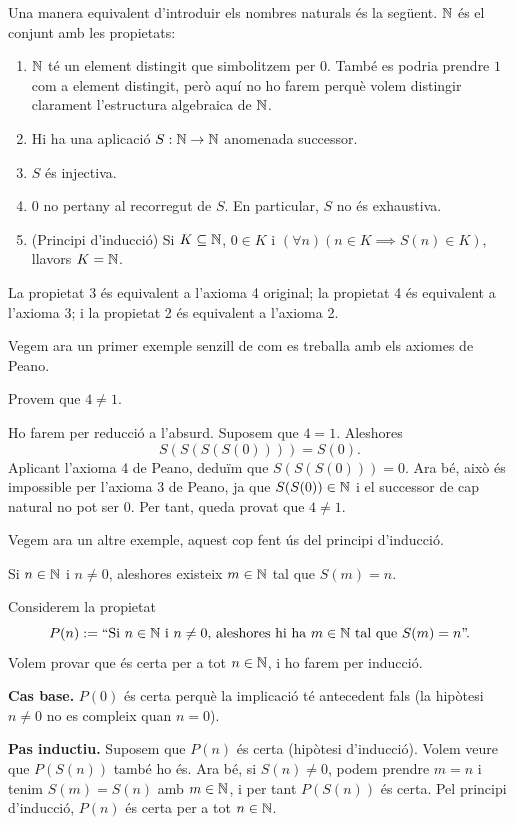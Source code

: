 \begin{observacio}
Una manera equivalent d'introduir els nombres naturals és la següent. $\mathbb{N}$ és el conjunt amb les propietats:
\begin{enumerate}
\item $\mathbb{N}$ té un element distingit que simbolitzem per $0$. També es podria prendre $1$ com a element distingit, però aquí no ho farem perquè volem distingir clarament l'estructura algebraica de $\mathbb{N}$.
\item Hi ha una aplicació $S:\mathbb{N}\rightarrow \mathbb{N}$ anomenada successor.
\item $S$ és injectiva.
\item $0$ no pertany al recorregut de $S$. En particular, $S$ no és exhaustiva.
\item (Principi d'inducció) Si $K\subseteq \mathbb{N}$, $0\in K$ i $\left( \forall n\right) \left( n\in K\implies S(n)\in K\right)$, llavors $K=\mathbb{N}$.
\end{enumerate}
La propietat 3 és equivalent a l'axioma 4 original; la propietat 4 és equivalent a l'axioma 3; i la propietat 2 és equivalent a l’axioma 2.
\end{observacio}

Vegem ara un primer exemple senzill de com es treballa amb els axiomes de Peano.

\begin{exemple}
Provem que $4\neq 1$.
\end{exemple}

\begin{solucio}
Ho farem per reducció a l'absurd. Suposem que $4=1$. Aleshores
\[
S\left(S(S(S(0)))\right)=S(0).
\]
Aplicant l'axioma 4 de Peano, deduïm que $S(S(S(0)))=0$. Ara bé, això és impossible per l'axioma 3 de Peano, ja que $S(S(0))\in \mathbb{N}$ i el successor de cap natural no pot ser $0$. Per tant, queda provat que $4\neq 1$.
\end{solucio}

Vegem ara un altre exemple, aquest cop fent ús del principi d'inducció.

\begin{exemple}\label{3}
Si $n\in \mathbb{N}$ i $n\neq 0$, aleshores existeix $m\in \mathbb{N}$ tal que $S(m)=n$.
\end{exemple}

\begin{solucio}
Considerem la propietat
\[
P(n):=\text{``Si $n\in \mathbb{N}$ i $n\neq 0$, aleshores hi ha $m\in \mathbb{N}$ tal que $S(m)=n$''.}
\]
Volem provar que és certa per a tot $n\in \mathbb{N}$, i ho farem per inducció.

\textbf{Cas base.} $P(0)$ és certa perquè la implicació té antecedent fals (la hipòtesi $n\neq 0$ no es compleix quan $n=0$).

\textbf{Pas inductiu.} Suposem que $P(n)$ és certa (hipòtesi d'inducció). Volem veure que $P(S(n))$ també ho és. Ara bé, si $S(n)\neq 0$, podem prendre $m=n$ i tenim $S(m)=S(n)$ amb $m\in \mathbb{N}$, i per tant $P(S(n))$ és certa. Pel principi d'inducció, $P(n)$ és certa per a tot $n\in \mathbb{N}$.
\end{solucio}

